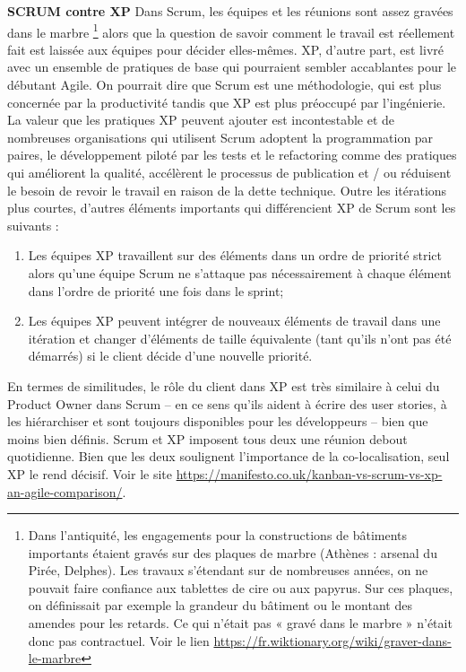 \textbf{SCRUM contre XP}
\newline
Dans Scrum, les équipes et les réunions sont assez gravées dans le marbre \footnote{Dans l’antiquité, les engagements pour la constructions de bâtiments importants étaient gravés sur des plaques de marbre (Athènes : arsenal du Pirée, Delphes). Les travaux s’étendant sur de nombreuses années, on ne pouvait faire confiance aux tablettes de cire ou aux papyrus. Sur ces plaques, on définissait par exemple la grandeur du bâtiment ou le montant des amendes pour les retards. Ce qui n’était pas « gravé dans le marbre » n’était donc pas contractuel. Voir le lien \href{https://fr.wiktionary.org/wiki/graver_dans_le_marbre}{https://fr.wiktionary.org/wiki/graver-dans-le-marbre}} alors que la question de savoir comment le travail est réellement fait est laissée aux équipes pour décider elles-mêmes. XP, d’autre part, est livré avec un ensemble de pratiques de base qui pourraient sembler accablantes pour le débutant Agile. \newline
On pourrait dire que Scrum est une méthodologie, qui est plus concernée par la productivité tandis que XP est plus préoccupé par l’ingénierie. \newline
La valeur que les pratiques XP peuvent ajouter est incontestable et de nombreuses organisations qui utilisent Scrum adoptent la programmation par paires, le développement piloté par les tests et le refactoring comme des pratiques qui améliorent la qualité, accélèrent le processus de publication et / ou réduisent le besoin de revoir le travail en raison de la dette technique. \newline
Outre les itérations plus courtes, d’autres éléments importants qui différencient XP de Scrum sont les suivants :
\begin{enumerate}
	\item Les équipes XP travaillent sur des éléments dans un ordre de priorité strict alors qu’une équipe Scrum ne s’attaque pas nécessairement à chaque élément dans l’ordre de priorité une fois dans le sprint;
	\item Les équipes XP peuvent intégrer de nouveaux éléments de travail dans une itération et changer d’éléments de taille équivalente (tant qu’ils n’ont pas été démarrés) si le client décide d’une nouvelle priorité.
\end{enumerate}
En termes de similitudes, le rôle du client dans XP est très similaire à celui du Product Owner dans Scrum – en ce sens qu’ils aident à écrire des user stories, à les hiérarchiser et sont toujours disponibles pour les développeurs – bien que moins bien définis. \newline
Scrum et XP imposent tous deux une réunion debout quotidienne. Bien que les deux soulignent l’importance de la co-localisation, seul XP le rend décisif. Voir le site \href{https://manifesto.co.uk/kanban-vs-scrum-vs-xp-an-agile-comparison/}{https://manifesto.co.uk/kanban-vs-scrum-vs-xp-an-agile-comparison/}.


